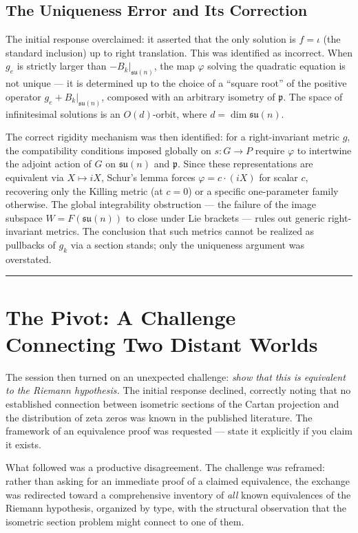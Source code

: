 \documentclass[12pt]{article}
\begin{document}
\subsection{The Uniqueness Error and Its Correction}

The initial response overclaimed: it asserted that the only solution is $f = \iota$
(the standard inclusion) up to right translation. This was identified as incorrect.
When $g_e$ is strictly larger than $-B_k|_{\mathfrak{su}(n)}$, the map $\varphi$
solving the quadratic equation is not unique --- it is determined up to the choice of a
``square root'' of the positive operator $g_e + B_k|_{\mathfrak{su}(n)}$, composed with
an arbitrary isometry of $\mathfrak{p}$. The space of infinitesimal solutions is an
$O(d)$-orbit, where $d = \dim \mathfrak{su}(n)$.

The correct rigidity mechanism was then identified: for a right-invariant metric $g$,
the compatibility conditions imposed globally on $s: G \to P$ require $\varphi$ to
intertwine the adjoint action of $G$ on $\mathfrak{su}(n)$ and $\mathfrak{p}$. Since
these representations are equivalent via $X \mapsto iX$, Schur's lemma forces
$\varphi = c \cdot (iX)$ for scalar $c$, recovering only the Killing metric (at $c=0$)
or a specific one-parameter family otherwise. The global integrability obstruction ---
the failure of the image subspace $W = F(\mathfrak{su}(n))$ to close under Lie brackets
--- rules out generic right-invariant metrics. The conclusion that such metrics cannot
be realized as pullbacks of $g_k$ via a section stands; only the uniqueness argument
was overstated.

\bigskip
\hrule
\bigskip

\section{The Pivot: A Challenge Connecting Two Distant Worlds}

The session then turned on an unexpected challenge: \textit{show that this is
equivalent to the Riemann hypothesis.} The initial response declined, correctly noting
that no established connection between isometric sections of the Cartan projection and
the distribution of zeta zeros was known in the published literature. The framework of
an equivalence proof was requested --- state it explicitly if you claim it exists.

What followed was a productive disagreement. The challenge was reframed: rather than
asking for an immediate proof of a claimed equivalence, the exchange was redirected
toward a comprehensive inventory of \textit{all} known equivalences of the Riemann
hypothesis, organized by type, with the structural observation that the isometric
section problem might connect to one of them.
\end{document}

